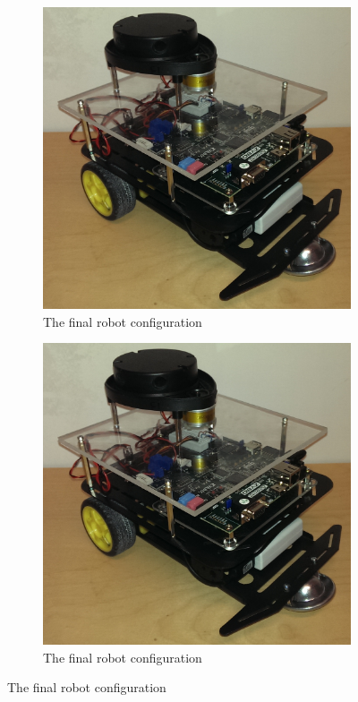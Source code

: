\documentclass[Main]{subfiles}
\begin{document}
\begin{figure}
\begin{subfigure}
\centering
	\includegraphics[scale=1]{./Figures/final_robot.png}
	\caption{The final robot configuration}
	\label{fig:final_robot}
\end{subfigure}
\begin{subfigure}
\centering
	\includegraphics[width=0.5\linewidth]{./Figures/final_robot.png}
	\caption{The final robot configuration}
	\label{fig:final_robot}
\end{subfigure}
\caption{The final robot configuration}
\label{fig:final_robot}
\end{figure}


\end{document}
